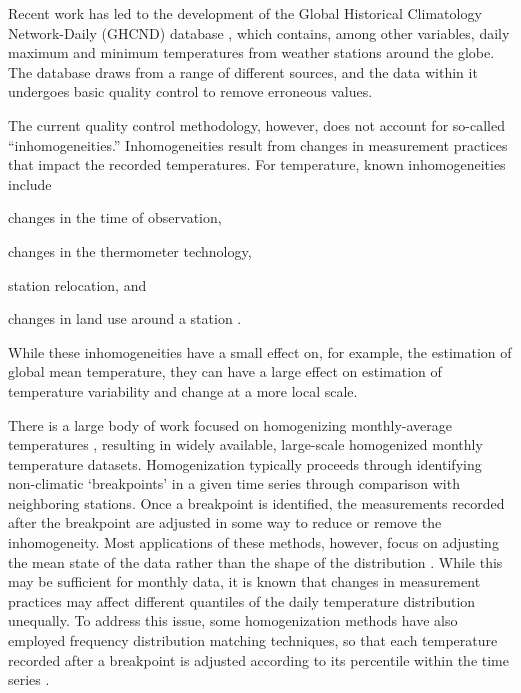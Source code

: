 \documentclass[12pt]{article}
\begin{document}
Recent work has led to the development of the Global Historical Climatology Network-Daily (GHCND) database \citep{menne2012overview}, which contains, among other variables, daily maximum and minimum temperatures from weather stations around the globe. The database draws from a range of different sources, and the data within it undergoes basic quality control to remove erroneous values. 

The current quality control methodology, however, does not account for so-called ``inhomogeneities.'' Inhomogeneities result from changes in measurement practices that impact the recorded temperatures. For temperature, known inhomogeneities include 
\begin{flatlist}
    \item changes in the time of observation, 
    \item changes in the thermometer technology, 
    \item station relocation, and 
    \item changes in land use around a station \citep{menne2009us}.
\end{flatlist}
While these inhomogeneities have a small effect on, for example, the estimation of global mean temperature, they can have a large effect on estimation of temperature variability and change at a more local scale.

There is a large body of work focused on homogenizing monthly-average temperatures \citep[e.g.,][]{karl1986model, easterling1996development, peterson1998homogeneity, ducre2003comparison, menne2009homogenization, vincent2012second}, resulting in widely available, large-scale homogenized monthly temperature datasets. 
Homogenization typically proceeds through identifying non-climatic `breakpoints' in a given time series through comparison with neighboring stations.
Once a breakpoint is identified, the measurements recorded after the breakpoint are adjusted in some way to reduce or remove the inhomogeneity.
Most applications of these methods, however, focus on adjusting the mean state of the data rather than the shape of the distribution \citep[see][and references therein]{della2006method}.
While this may be sufficient for monthly data, it is known that changes in measurement practices may affect different quantiles of the daily temperature distribution unequally.
To address this issue, some homogenization methods have also employed frequency distribution matching techniques, so that each temperature recorded after a breakpoint is adjusted according to its percentile within the time series \citep{della2006method, trewin2013daily}. 
\end{document}
